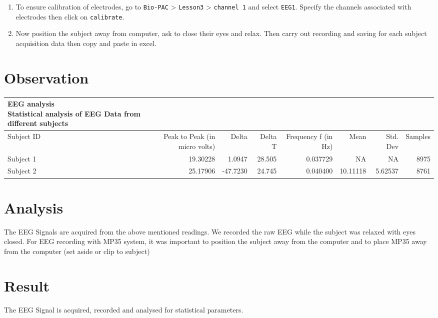 \documentclass[
  11pt,
  letterpaper,
  DIV=11,
  numbers=noendperiod]{scrreprt}
\begin{document}
\begin{enumerate}
\def\labelenumi{\arabic{enumi}.}
\setcounter{enumi}{1}
\item
  To ensure calibration of electrodes, go to \texttt{Bio-PAC}
  \textgreater{} \texttt{Lesson3} \textgreater{} \texttt{channel\ 1} and
  select \texttt{EEG1}. Specify the channels associated with electrodes
  then click on \texttt{calibrate}.
\item
  Now position the subject away from computer, ask to close their eyes
  and relax. Then carry out recording and saving for each subject
  acquisition data then copy and paste in excel.
\end{enumerate}

\section{Observation}\label{observation-3}

\begin{longtable*}{lrrrrrrr}
\caption*{
{\large EEG analysis} \\ 
{\small Statistical analysis of EEG Data from different subjects}
} \\ 
\toprule
Subject ID & Peak to Peak (in micro volts) & Delta & Delta T & Frequency f (in Hz) & Mean & Std. Dev & Samples \\ 
\midrule\addlinespace[2.5pt]
Subject 1 & 19.30228 & 1.0947 & 28.505 & 0.037729 & NA & NA & 8975 \\ 
Subject 2 & 25.17906 & -47.7230 & 24.745 & 0.040400 & 10.11118 & 5.62537 & 8761 \\ 
\bottomrule
\end{longtable*}

\section{Analysis}\label{analysis-3}

The EEG Signals are acquired from the above mentioned readings. We
recorded the raw EEG while the subject was relaxed with eyes closed. For
EEG recording with MP35 system, it was important to position the subject
away from the computer and to place MP35 away from the computer (set
aside or clip to subject)

\section{Result}\label{result-3}

The EEG Signal is acquired, recorded and analysed for statistical
parameters.
\end{document}
